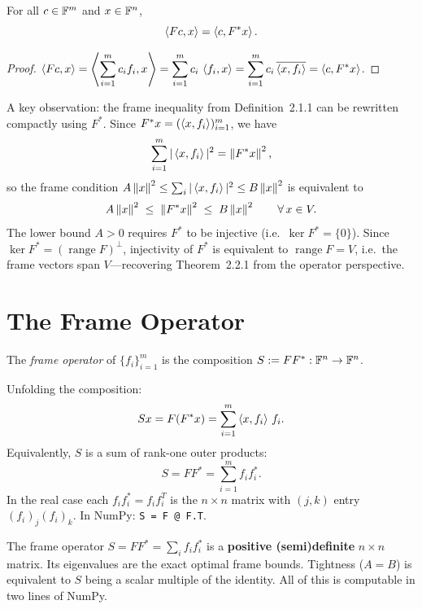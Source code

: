 \begin{proposition}
\label{prop:adjoint-formula}
For all $c\in\mathbb{F}^m$ and $x\in\mathbb{F}^n$,
\[
  \left\langle Fc, x \right\rangle = \left\langle c, F^*x \right\rangle.
\]
\end{proposition}

\begin{proof}
$\displaystyle
\left\langle Fc, x \right\rangle
= \left\langle \sum_{i=1}^m c_i f_i, x \right\rangle
= \sum_{i=1}^m c_i\,\left\langle f_i, x \right\rangle
= \sum_{i=1}^m c_i\,\overline{\left\langle x, f_i \right\rangle}
= \left\langle c, F^*x \right\rangle$.
\end{proof}

\medskip
A key observation: the frame inequality from Definition~2.1.1 can be
rewritten compactly using $F^*$. Since
$F^*x = (\left\langle x, f_i \right\rangle)_{i=1}^m$, we have
\[
  \sum_{i=1}^m |\left\langle x, f_i \right\rangle|^2 = \left\| F^*x \right\|^2,
\]
so the frame condition $A\left\| x \right\|^2 \le \sum_i|\left\langle x, f_i \right\rangle|^2\le
B\left\| x \right\|^2$ is equivalent to
\begin{equation}
\label{eq:frame-ineq-compact}
  A\left\| x \right\|^2 \;\le\; \left\| F^*x \right\|^2 \;\le\; B\left\| x \right\|^2
  \qquad\forall\,x\in V.
\end{equation}
The lower bound $A>0$ requires $F^*$ to be injective (i.e.\ $\ker
F^*=\{0\}$). Since $\ker F^* = (\operatorname{range} F)^\perp$,
injectivity of $F^*$ is equivalent to $\operatorname{range} F = V$, i.e.\
the frame vectors span $V$---recovering Theorem~2.2.1 from the operator
perspective.

\section{The Frame Operator}
\label{sec:frame-operator}

\begin{definition}
\label{def:frame-operator}
The \emph{frame operator} of $\{f_i\}_{i=1}^m$ is the composition
$S:=FF^*:\mathbb{F}^n\to\mathbb{F}^n$.
\end{definition}

Unfolding the composition:
\[
  Sx = F(F^*x) = \sum_{i=1}^m \left\langle x, f_i \right\rangle\,f_i.
\]
Equivalently, $S$ is a sum of rank-one outer products:
\begin{equation}
\label{eq:frame-op-outer}
  S = FF^* = \sum_{i=1}^m f_i f_i^*.
\end{equation}
In the real case each $f_i f_i^* = f_i f_i^T$ is the $n\times n$ matrix
with $(j,k)$ entry $(f_i)_j(f_i)_k$. In NumPy: \texttt{S = F @ F.T}.

\begin{keyidea}
The frame operator $S=FF^*=\sum_i f_i f_i^*$ is a \textbf{positive
(semi)definite} $n\times n$ matrix. Its eigenvalues are the exact
optimal frame bounds. Tightness ($A=B$) is equivalent to $S$ being a
scalar multiple of the identity. All of this is computable in two lines
of NumPy.
\end{keyidea}

